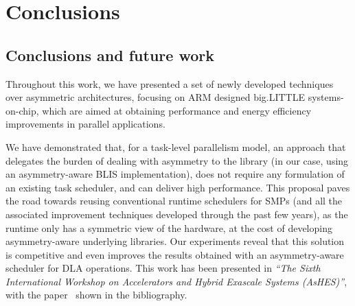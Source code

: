 \cleardoublepage

\chapter*{Conclusions}

\section*{Conclusions and future work}


Throughout this work, we have presented a set of newly developed techniques
over asymmetric architectures, focusing on ARM designed big.LITTLE
systems-on-chip, which are aimed at obtaining performance and energy
efficiency improvements in parallel applications.



We have demonstrated that, for a task-level parallelism model, an approach
that delegates the burden of dealing with asymmetry to the library (in our
case, using an asymmetry-aware BLIS implementation), does not require any
formulation of an existing task scheduler, and can deliver high
performance. This proposal paves the road towards reusing conventional
runtime schedulers for SMPs (and all the associated improvement techniques
developed through the past few years), as the runtime only has a symmetric
view of the hardware, at the cost of developing asymmetry-aware underlying
libraries. Our experiments reveal that this solution is competitive and
even improves the results obtained with an asymmetry-aware scheduler for
DLA operations. This work has been presented in \emph{``The Sixth
  International Workshop on Accelerators and Hybrid Exascale Systems
  (AsHES)''}, with the paper~\cite{ashes} shown in the bibliography.





